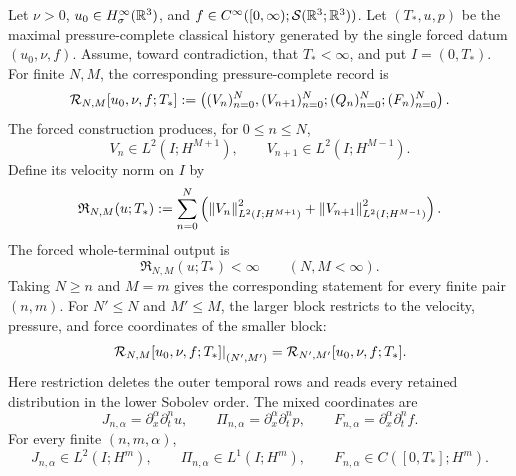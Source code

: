 \begin{theorem}
\label{f:thm:datum-finite-blocks}
Let \(\nu>0\), \(u_0\in H^\infty_\sigma(\mathbb R^3)\), and
\(f\in C^\infty([0,\infty);\mathcal S(\mathbb R^3;\mathbb R^3))\). Let
\((T_*,u,p)\) be the maximal pressure-complete classical history generated
by the single forced datum \((u_0,\nu,f)\). Assume, toward contradiction, that
\(T_*<\infty\), and put \(I=(0,T_*)\).  For finite \(N,M\), the corresponding
pressure-complete record is
\begin{equation}
 \mathcal R_{N,M}[u_0,\nu,f;T_*]
 :=\left((V_n)_{n=0}^{N},(V_{n+1})_{n=0}^{N};
 (Q_n)_{n=0}^{N};(F_n)_{n=0}^{N}\right).
 \label{f:eq:forced-datum-rectangle-record}
\end{equation}
The forced construction produces, for \(0\le n\le N\),
\begin{equation}
 V_n\in L^2(I;H^{M+1}),\qquad
 V_{n+1}\in L^2(I;H^{M-1}).
 \label{f:eq:independent-adjacent-finite-rows}
\end{equation}
Define its velocity norm on \(I\) by
\begin{equation}
 \mathfrak R_{N,M}(u;T_*)
 :=\sum_{n=0}^{N}\left(
 \left\lVert V_n\right\rVert_{L^2(I;H^{M+1})}^2
 +\left\lVert V_{n+1}\right\rVert_{L^2(I;H^{M-1})}^2
 \right).
 \label{f:eq:forced-restricted-block-norm}
\end{equation}
The forced whole-terminal output is
\begin{equation}
 \mathfrak R_{N,M}(u;T_*)<\infty
 \qquad(N,M<\infty).
 \label{f:eq:forced-datum-block-output}
\end{equation}
Taking \(N\ge n\) and \(M=m\) gives the corresponding statement for every
finite pair \((n,m)\).
For \(N'\le N\) and \(M'\le M\), the larger block restricts to the
velocity, pressure, and force coordinates of the smaller block:
\begin{equation}
 \left.\mathcal R_{N,M}[u_0,\nu,f;T_*]\right|_{(N',M')}
 =\mathcal R_{N',M'}[u_0,\nu,f;T_*].
 \label{f:eq:independent-intersection-record}
\end{equation}
Here restriction deletes the outer temporal rows and reads every retained
distribution in the lower Sobolev order.  The mixed coordinates are
\[
 J_{n,\alpha}=\partial_x^\alpha\partial_t^nu,
 \qquad
 \Pi_{n,\alpha}=\partial_x^\alpha\partial_t^np,
 \qquad
 F_{n,\alpha}=\partial_x^\alpha\partial_t^nf.
\]
For every finite \((n,m,\alpha)\),
\[
 J_{n,\alpha}\in L^2(I;H^m),\qquad
 \Pi_{n,\alpha}\in L^1(I;H^m),\qquad
 F_{n,\alpha}\in C([0,T_*];H^m).
\]
\end{theorem}

